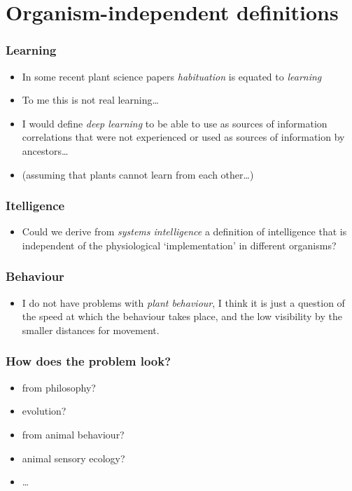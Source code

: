 \documentclass[utf8]{beamer}\usepackage[]{graphicx}\usepackage[]{color} %
\begin{document}
\section{Organism-independent definitions}

\begin{frame}[<+->]
  \frametitle{Learning}
  \begin{itemize}
    \item In some recent plant science papers \emph{habituation} is equated to \emph{learning}
    \item To me this is not real learning\ldots
    \item I would define \emph{deep learning} to be able to use as sources of information correlations that were not experienced
    or used as sources of information by ancestors\ldots
    \item (assuming that plants cannot learn from each other\ldots)
  \end{itemize}
\end{frame}

\begin{frame}[<+->]
  \frametitle{Itelligence}
  \begin{itemize}
    \item Could we derive from \emph{systems intelligence} a definition of intelligence
    that is independent of the physiological `implementation' in different organisms?
  \end{itemize}
\end{frame}

\begin{frame}[<+->]
  \frametitle{Behaviour}
  \begin{itemize}
    \item I do not have problems with \emph{plant behaviour}, I think it is just a
    question of the speed at which the behaviour takes place, and the low visibility
    by the smaller distances for movement.
  \end{itemize}
\end{frame}

\begin{frame}[<+->]
  \frametitle{How does the problem look?}
  \begin{itemize}
    \item from philosophy?
    \item evolution?
    \item from animal behaviour?
    \item animal sensory ecology?
    \item \ldots
  \end{itemize}
\end{frame}
\end{document}
